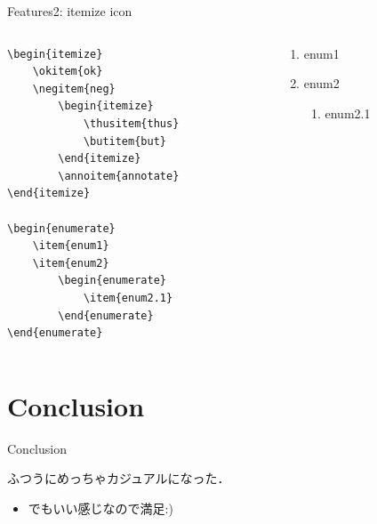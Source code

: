 \documentclass[aspectratio=1610,14pt]{beamer}
\begin{document}
\begin{frame}[fragile]{Features2: itemize icon}
    \begin{columns}
        \begin{column}{0.5\textwidth}
            \begin{lstlisting}
\begin{itemize}
    \okitem{ok}
    \negitem{neg}
        \begin{itemize}
            \thusitem{thus}
            \butitem{but}
        \end{itemize}
        \annoitem{annotate}
\end{itemize}

\begin{enumerate}
    \item{enum1}
    \item{enum2}
        \begin{enumerate}
            \item{enum2.1}
        \end{enumerate}
\end{enumerate}            
            \end{lstlisting}
        \end{column}
        \begin{column}{0.5\textwidth}
            \begin{itemize}
                    \begin{itemize}
                    \end{itemize}
            \end{itemize}

            \begin{enumerate}
                \item{enum1}
                \item{enum2}
                    \begin{enumerate}
                        \item{enum2.1}
                    \end{enumerate}
            \end{enumerate}
        \end{column}
    \end{columns}
\end{frame}

\section{Conclusion}

\begin{frame}
    \tableofcontents[currentsection]
\end{frame}

\begin{frame}{Conclusion}
    \begin{textblock}{ふつうにめっちゃカジュアルになった．}
        \begin{itemize}
            \item{でも\alert{いい感じ}なので満足:)}
        \end{itemize}
    \end{textblock}
\end{frame}
%
%
%
%
\end{document}
